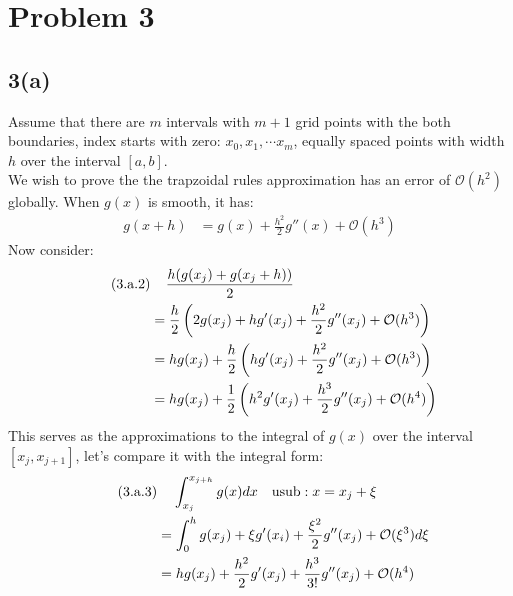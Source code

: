 \documentclass[]{article}
\begin{document}
\section*{Problem 3}
    \subsection*{3(a)}
        Assume that there are $m$ intervals with $m + 1$ grid points with the both boundaries, index starts with zero: $x_0, x_1, \cdots x_m$, equally spaced points with width $h$ over the interval $[a, b]$. 
        \\
        We wish to prove the the trapzoidal rules approximation has an error of $\mathcal{O}(h^2)$ globally. When $g(x)$ is smooth, it has: 
        \begin{align*}\tag{3.a.1}\label{eqn:3.a.1}
            g(x + h) &= g(x) + \frac{h^2}{2}g''(x) + \mathcal{O}(h^3)
        \end{align*}
        Now consider: 
        \begin{align*}\tag{3.a.2}\label{eqn:3.a.2}
            &\hspace{1.1em} 
            \frac{h(g(x_j) + g(x_j + h))}{2}\\
            &= 
            \frac{h}{2}\left(
                2g(x_j) + hg'(x_j) + \frac{h^2}{2}g''(x_j)
                + \mathcal{O}(h^3) 
            \right)
            \\
            &= 
            hg(x_j) + \frac{h}{2}\left(
                hg'(x_j) + \frac{h^2}{2}g''(x_j) + \mathcal{O}(h^3)
            \right)
            \\
            &= 
            hg(x_j) +  \frac{1}{2}\left(
                h^2g'(x_j) + \frac{h^3}{2}g''(x_j) + \mathcal{O}(h^4)
            \right)
        \end{align*}
        This serves as the approximations to the integral of $g(x)$ over the interval $[x_j, x_{j + 1}]$, let's compare it with the integral form: 
        \begin{align*}\tag{3.a.3}\label{eqn:3.a.3}
            & \hspace{1.1em}
            \int_{x_j}^{x_{j + h}} g(x)dx \quad \text{usub}: x = x_j+ \xi\\ 
            &= \int_{0}^{h} 
                g(x_j) + \xi g'(x_i) + \frac{\xi^2}{2}g''(x_j) + 
                \mathcal{O}(\xi^3)
            d\xi
            \\
            &= hg(x_j) + \frac{h^2}{2}g'(x_j) + \frac{h^3}{3!}g''(x_j) + \mathcal{O}(h^4)
        \end{align*}
\end{document}
